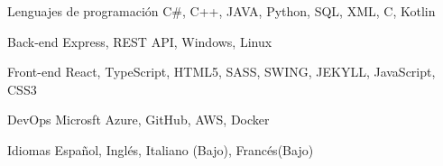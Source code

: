 

\begin{cvskills}
    \cvskill
    {Lenguajes de programación} %
    {C\#, C++, JAVA, Python, SQL,  XML, C, Kotlin} %

    \cvskill
    {Back-end} %
    {Express, REST API, Windows, Linux} %


    \cvskill
    {Front-end} %
    {React, TypeScript, HTML5, SASS, SWING, JEKYLL, JavaScript, CSS3} %

    \cvskill
    {DevOps} %
    {Microsft Azure, GitHub, AWS, Docker} %

    \cvskill
    {Idiomas} %
    {Español, Inglés, Italiano (Bajo), Francés(Bajo) } %
    
   

\end{cvskills}
